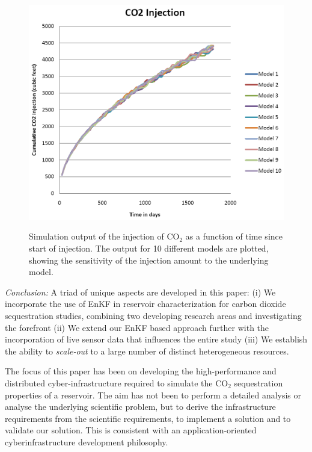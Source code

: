 \documentclass{rspublic}
\newcommand{\jhanote}[1]{ {\textcolor{red} { ***Jha: #1 }}}
\newcommand{\jhanote}[1]{}
\begin{document}
\begin{figure}
\begin{center}\
\includegraphics[scale=0.33]{figures/co2seq.png}
\end{center}
\caption[Simulation Output]{Simulation output of the injection of
  CO$_2$ as a function of time since start of injection. The output for 10  different models are
  plotted, showing the sensitivity of the injection amount to the
  underlying model.}
\label{fig:SensorRelay}
\end{figure}


{\it Conclusion: }A triad of unique aspects are developed in this
paper: (i) We incorporate the use of EnKF in reservoir
characterization for carbon dioxide sequestration studies, combining
two developing research areas and investigating the forefront (ii) We
extend our EnKF based approach further with the incorporation of live
sensor data that influences the entire study (iii) We establish the
ability to {\it scale-out} to a large number of distinct heterogeneous
resources.

The focus of this paper has been on developing the high-performance
and distributed cyber-infrastructure required to simulate the CO$_2$
sequestration properties of a reservoir. The aim has not been to
perform a detailed analysis or analyse the underlying scientific
problem, but to derive the infrastructure requirements from the
scientific requirements, to implement a solution and to validate our
solution. This is consistent with an application-oriented
cyberinfrastructure development philosophy.




\end{document}
